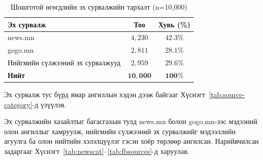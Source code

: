 \begin{table}[H]
\centering
\caption{Шошготой өгөгдлийн эх сурвалжийн тархалт (n=10{,}000)}
\label{tab:data_full_corpus}
\begin{tabular}{@{}lcc@{}}
\toprule
\textbf{Эх сурвалж} & \textbf{Тоо} & \textbf{Хувь (\%)} \\
\midrule
news.mn                & $4{,}230$ & $42.3\%$ \\
gogo.mn                & $2{,}811$ & $28.1\%$ \\
Нийгмийн сүлжээний эх сурвалжууд & $2{,}959$ & $29.6\%$ \\
\midrule
\textbf{Нийт} & $\mathbf{10{,}000}$ & $\mathbf{100\%}$ \\
\bottomrule
\end{tabular}
\end{table}

Эх сурвалж тус бүрд ямар ангиллын хэдэн дээж байгааг
Хүснэгт~\ref{tab:source-category}-д үзүүлэв.

\begin{table}[H]
\centering
\caption{Эх сурвалж тус бүрийн ангиллын задаргаа}
\label{tab:source-category}
\end{table}

Эх сурвалжийн хазайлтыг багасгахын тулд news.mn болон gogo.mn-ээс мэдээний олон
ангиллыг хамруулж, нийгмийн сүлжээний эх сурвалжийг мэдээллийн агуулга ба
олон нийтийн хэлэлцүүлэг гэсэн хоёр төрлөөр ангилсан.
Нарийвчилсан задаргааг Хүснэгт~\ref{tab:newscat}--\ref{tab:fbsources}-д харуулав.

